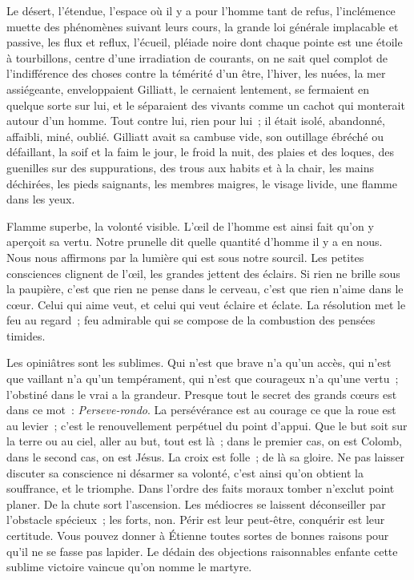 \documentclass[french,twoside]{book} %
\begin{document}
Le désert, l’étendue, l’espace où il y a pour l’homme tant de refus, l’inclémence muette des phénomènes suivant leurs cours, la grande loi générale implacable et passive, les flux et reflux, l’écueil, pléiade noire dont chaque pointe est une étoile à tourbillons, centre d’une irradiation de courants, on ne sait quel complot  de l’indifférence des choses contre la témérité d’un être, l’hiver, les nuées, la mer assiégeante, enveloppaient Gilliatt, le cernaient lentement, se fermaient en quelque sorte sur lui, et le séparaient des vivants comme un cachot qui monterait autour d’un homme. Tout contre lui, rien pour lui ; il était isolé, abandonné, affaibli, miné, oublié. Gilliatt avait sa cambuse vide, son outillage ébréché ou défaillant, la soif et la faim le jour, le froid la nuit, des plaies et des loques, des guenilles sur des suppurations, des trous aux habits et à la chair, les mains déchirées, les pieds saignants, les membres maigres, le visage livide, une flamme dans les yeux.\par
Flamme superbe, la volonté visible. L’œil de l’homme est ainsi fait qu’on y aperçoit sa vertu. Notre prunelle dit quelle quantité d’homme il y a en nous. Nous nous affirmons par la lumière qui est sous notre sourcil. Les petites consciences clignent de l’œil, les grandes jettent des éclairs. Si rien ne brille sous la paupière, c’est que rien ne pense dans le cerveau, c’est que rien n’aime dans le cœur. Celui qui aime veut, et celui qui veut éclaire et éclate. La résolution met le feu au regard ; feu admirable qui se compose de la combustion des pensées timides.\par
Les opiniâtres sont les sublimes. Qui n’est que brave n’a qu’un accès, qui n’est que vaillant n’a qu’un tempérament, qui n’est que courageux n’a qu’une vertu ; l’obstiné dans le vrai a la grandeur. Presque tout le secret des grands cœurs est dans ce mot : \emph{Perseve-rondo}. La persévérance est au courage ce que la roue  est au levier ; c’est le renouvellement perpétuel du point d’appui. Que le but soit sur la terre ou au ciel, aller au but, tout est là ; dans le premier cas, on est Colomb, dans le second cas, on est Jésus. La croix est folle ; de là sa gloire. Ne pas laisser discuter sa conscience ni désarmer sa volonté, c’est ainsi qu’on obtient la souffrance, et le triomphe. Dans l’ordre des faits moraux tomber n’exclut point planer. De la chute sort l’ascension. Les médiocres se laissent déconseiller par l’obstacle spécieux ; les forts, non. Périr est leur peut-être, conquérir est leur certitude. Vous pouvez donner à Étienne toutes sortes de bonnes raisons pour qu’il ne se fasse pas lapider. Le dédain des objections raisonnables enfante cette sublime victoire vaincue qu’on nomme le martyre.\par
\end{document}
